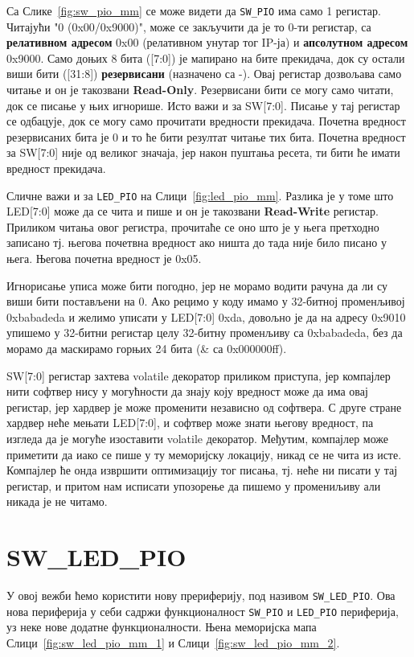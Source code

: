 \documentclass[12pt]{article}
\begin{document}
\par
Са Слике~\ref{fig:sw_pio_mm} се може видети да
\verb|SW_PIO| има само 1 регистар.
Читајући "0 (0x00/0x9000)",
може се закључити да је то 0-ти регистар,
са \textbf{релативном адресом} 0x00 (релативном унутар тог IP-ја)
и \textbf{апсолутном адресом} 0x9000.
Само доњих 8 бита ([7:0]) је мапирано на бите прекидача,
док су остали виши бити ([31:8]) \textbf{резервисани} (назначено са -).
Овај регистар дозвољава само читање и он је такозвани \textbf{Read-Only}.
Резервисани бити се могу само читати, док се писање у њих игнорише.
Исто важи и за SW[7:0].
Писање у тај регистар се одбацује,
док се могу само прочитати вредности прекидача.
Почетна вредност резервисаних бита је 0 и то ће бити резултат читање тих бита.
Почетна вредност за SW[7:0] није од великог значаја,
јер након пуштања ресета, ти бити ће имати вредност прекидача.
\par
Сличне важи и за \verb|LED_PIO| на Слици~\ref{fig:led_pio_mm}.
Разлика је у томе што LED[7:0] може да се чита и пише
и он је такозвани \textbf{Read-Write} регистар.
Приликом читања овог регистра,
прочитаће се оно што је у њега претходно записано
тј. његова почетвна вредност ако ништа до тада није било писано у њега.
Његова почетна вредност је 0x05.
\par
Игнорисање уписа може бити погодно,
јер не морамо водити рачуна да ли су виши бити постављени на 0.
Ако рецимо у коду имамо у 32-битној променљивој 0xbabadeda
и желимо уписати у LED[7:0] 0xda,
довољно је да на адресу 0x9010 упишемо у 32-битни регистар
целу 32-битну променљиву са 0xbabadeda,
без да морамо да маскирамо горњих 24 бита (\& са 0x000000ff).
\par
SW[7:0] регистар захтева volatile декоратор приликом приступа,
јер компајлер нити софтвер нису у могућности да знају
коју вредност може да има овај регистар,
јер хардвер је може променити независно од софтвера.
С друге стране хардвер неће мењати LED[7:0],
и софтвер може знати његову вредност,
па изгледа да је могуће изоставити volatile декоратор.
Међутим, компајлер може приметити да
иако се пише у ту меморијску локацију, никад се не чита из исте.
Компајлер ће онда извршити оптимизацију тог писања,
тј. неће ни писати у тај регистар,
и притом нам исписати упозорење да
пишемо у промениљиву али никада је не читамо.

\section{SW\_LED\_PIO}
\par
У овој вежби ћемо користити нову прериферију, под називом \verb|SW_LED_PIO|.
Ова нова периферија у себи садржи функционалност
\verb|SW_PIO| и \verb|LED_PIO| периферија,
уз неке нове додатне функционалности.
Њена меморијска мапа
Слици~\ref{fig:sw_led_pio_mm_1} и Слици~\ref{fig:sw_led_pio_mm_2}.
\end{document}
